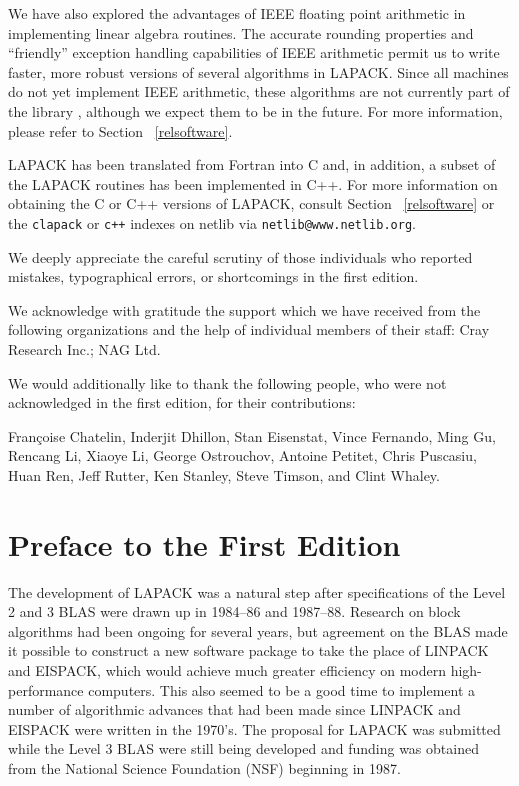 We have also explored the advantages of IEEE floating point arithmetic
\cite{ieee754} 
in implementing linear algebra routines. The accurate rounding properties
and ``friendly'' exception handling capabilities of IEEE arithmetic
permit us to write faster, more robust versions of several algorithms in
LAPACK. Since all machines do not yet implement IEEE arithmetic, these
algorithms are not currently part of the library \cite{demmelli93},
although we expect them to be in the future.  For more information,
please refer to Section ~\ref{relsoftware}.

LAPACK has been translated from Fortran into C and, in addition,
a subset of the LAPACK routines has been implemented in C++.
For more information on obtaining the C or C++ versions of LAPACK, consult 
Section ~\ref{relsoftware} or the 
{\tt clapack} or {\tt c++} indexes on netlib via {\tt netlib@www.netlib.org}. 

We deeply appreciate the careful scrutiny of those individuals who
reported mistakes, typographical errors, or shortcomings in the first
edition.

We acknowledge with gratitude the support which we have received from the
following organizations and the help of individual members of their staff:
Cray Research Inc.;
NAG Ltd.

We would additionally like to thank the following people, who were not
acknowledged in the first edition, for their contributions:

Fran\c{c}oise Chatelin,
Inderjit Dhillon,
Stan Eisenstat,
Vince Fernando,
Ming Gu,
Rencang Li,
Xiaoye Li,
George Ostrouchov,
Antoine Petitet,
Chris Puscasiu,
Huan Ren,
Jeff Rutter,
Ken Stanley,
Steve Timson,
and Clint Whaley.

\vspace{1in}

\chapter*{Preface to the First Edition}

The development of LAPACK was a natural step after specifications of
the Level 2 and 3 BLAS were drawn up in 1984--86 and 1987--88.
Research on block algorithms had been ongoing for several years,
but agreement on the BLAS made it possible to construct a new
software package to take the place of LINPACK and EISPACK,
which would achieve much greater efficiency on modern high-performance
computers.
This also seemed to be a good time to implement a number of
algorithmic advances that had been made since LINPACK and EISPACK
were written in the 1970's.
The proposal for LAPACK was submitted while the Level 3 BLAS were
still being developed and funding was obtained from the National 
Science Foundation (NSF) beginning in 1987.


